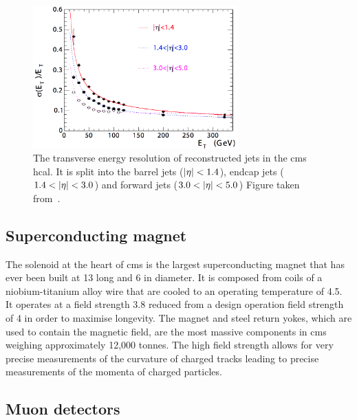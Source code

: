 \begin{figure}[htpb]
	\centering
	\includegraphics[width=0.7\textwidth]{Figures/CMSHCALRES}
	\caption[The transverse energy resolution of reconstructed jets in the \acrshort{cms} \acrshort{hcal}. It is split into the barrel jets ($\abseta<1.4$), endcap jets ($1.4<\abseta<3.0$) and forward jets ($3.0<\abseta<5.0$)]{The transverse energy resolution of reconstructed jets in the \acrshort{cms} \acrshort{hcal}. It is split into the barrel jets ($\abseta<1.4$), endcap jets ($1.4<\abseta<3.0$) and forward jets ($3.0<\abseta<5.0$) Figure taken from~\cite{CMSExperiment}.}
	\label{fig:CMSHCALRes}
\end{figure}

\subsection{Superconducting magnet}
\label{ssec:Magnet}

The solenoid at the heart of \acrshort{cms} is the largest superconducting magnet that has ever been built at 13\m{} long and 6\m{} in diameter.
It is composed from coils of a niobium-titanium alloy wire that are cooled to an operating temperature of 4.5\Kelvin{}. 
It operates at a field strength 3.8\Tesla{} reduced from a design operation field strength of 4\Tesla{} in order to maximise longevity.
The magnet and steel return yokes, which are used to contain the magnetic field, are the most massive components in \acrshort{cms} weighing approximately 12,000 tonnes.
The high field strength allows for very precise measurements of the curvature of charged tracks leading to precise measurements of the momenta of charged particles.

\subsection{Muon detectors}
\label{ssec:MuonChambers}

